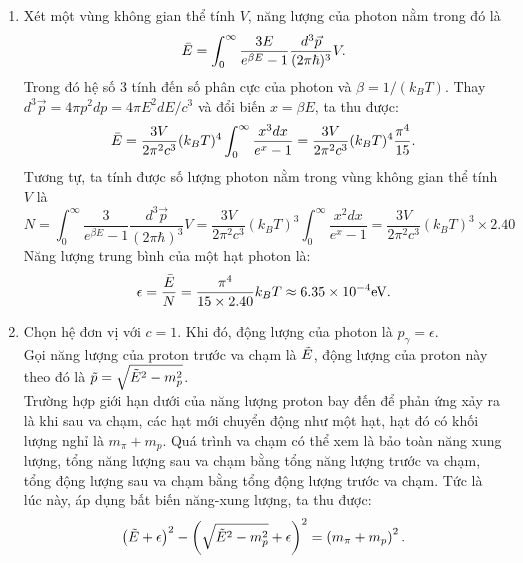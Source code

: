 \begin{enumerate}[label= \alph*)]
    \item Xét một vùng không gian thể tính $V$, năng lượng của photon nằm trong đó là
    \begin{equation} \label{eq1_GZK_limit}
        \Bar{E}= \int_{0}^{\infty}\frac{3E}{e^{\beta E}-1}\frac{d^3 \Vec{p}}{(2\pi \hbar)^3}V.
    \end{equation}
    Trong đó hệ số 3 tính đến số phân cực của photon và $\beta = 1/(k_B T)$. Thay $d^3\Vec{p}= 4\pi p^2dp = 4\pi E^2dE/c^3$ và đổi biến $x= \beta E$, ta thu được:
    \begin{equation} \label{eq2_GZK_limit}
        \Bar{E}= \frac{3V}{2\pi^2c^3}(k_BT)^4\int_{0}^{\infty}\frac{x^3dx}{e^{x}-1}=\frac{3V}{2\pi^2c^3}(k_BT)^4\frac{\pi^4}{15}.
    \end{equation}
    Tương tự, ta tính được số lượng photon nằm trong vùng không gian thể tính $V$ là
    \begin{equation} \label{eq3_GZK_limit}
        N = \int_{0}^{\infty}\frac{3}{e^{\beta E}-1}\frac{d^3 \Vec{p}}{(2\pi \hbar)^3}V=  \frac{3V}{2\pi^2c^3}(k_BT)^3\int_{0}^{\infty}\frac{x^2dx}{e^{x}-1}= \frac{3V}{2\pi^2c^3}(k_BT)^3\times 2.40
    \end{equation}
    Năng lượng trung bình của một hạt photon là:
    \begin{equation} \label{eq4_GZK_limit}
        \epsilon= \frac{\Bar{E}}{N}= \frac{\pi^4}{15\times 2.40}k_BT\approx 6.35 \times 10^{-4} \si{eV}.
    \end{equation}
    \item Chọn hệ đơn vị với $c=1$. Khi đó, động lượng của photon là $p_{\gamma}=\epsilon$. \\
    Gọi năng lượng của proton trước va chạm là $\Tilde{E}$, động lượng của proton này theo đó là $\Tilde{p} = \sqrt{\Tilde{E}^2 - m_p^2}$. \\
    Trường hợp giới hạn dưới của năng lượng proton bay đến để phản ứng xảy ra là khi sau va chạm, các hạt mới chuyển động như một hạt, hạt đó có khối lượng nghỉ là $m_{\pi}+m_p$. %
    Quá trình va chạm có thể xem là bảo toàn năng xung lượng, tổng năng lượng sau va chạm bằng tổng năng lượng trước va chạm, tổng động lượng sau va chạm bằng tổng động lượng trước va chạm. Tức là lúc này, áp dụng bất biến năng-xung lượng, ta thu được:
    \begin{equation} \label{eq5_GZK_limit}
        \left( \Tilde{E} + \epsilon \right)^2 - \left( \sqrt{\Tilde{E}^2 - m_p^2} + \epsilon \right)^2 = \left( m_{\pi} + m_p \right)^2.

\end{equation}
\end{enumerate}
